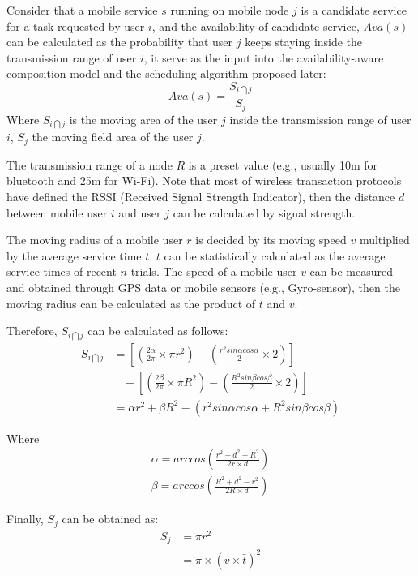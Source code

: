 \documentclass[journal]{IEEEtran}
\begin{document}
Consider that a mobile service $s$ running on mobile node $j$ is a candidate service for a task requested by user $i$, and the availability of candidate service, $Ava(s)$ can be calculated as the probability that user $j$ keeps staying inside the transmission range of user $i$, it serve as the input into the availability-aware composition model and the scheduling algorithm proposed later:
\begin{equation}
Ava(s) = \frac{S_{i \bigcap j}}{S_j}
\end{equation}
Where $S_{i \bigcap j}$ is the moving area of the user $j$ inside the transmission range of user $i$, $S_j$ the moving field area of the user $j$.

The transmission range of a node $R$ is a preset value (e.g., usually 10m for bluetooth and 25m for Wi-Fi). 
Note that most of wireless transaction protocols have defined the RSSI (Received Signal Strength Indicator), then the distance $d$ between mobile user $i$ and user $j$ can be calculated by signal strength.

The moving radius of a mobile user $r$ is decided by its moving speed $v$ multiplied by the average service time $\bar{t}$. $\bar{t}$ can be statistically calculated as the average service times of recent $n$ trials.
The speed of a mobile user $v$ can be measured and obtained through GPS data or mobile sensors (e.g., Gyro-sensor), then the moving radius can be calculated as the product of $\bar{t}$ and $v$.

Therefore, $S_{i \bigcap j}$ can be calculated as follows:
\setlength{\arraycolsep}{0.0em}
\begin{align}
S_{i \bigcap j} & =  [(\frac{2\alpha}{2\pi} \times \pi r^2)-(\frac{r^2 sin\alpha cos\alpha}{2} \times 2)]\\\nonumber
& \ \ \ \ +[(\frac{2\beta}{2\pi} \times \pi R^2)-(\frac{R^2 sin\beta cos\beta}{2} \times 2)]\\\nonumber
& = \alpha r^2 + \beta R^2 - (r^2 sin\alpha cos\alpha + R^2 sin\beta cos\beta)
\end{align}
\setlength{\arraycolsep}{5pt}

Where
\begin{eqnarray}
\alpha = arccos(\frac{r^2+d^2-R^2}{2r\times d}) \\\nonumber
\beta = arccos(\frac{R^2+d^2-r^2}{2R\times d})
\end{eqnarray}

Finally, $S_j$ can be obtained as:
\begin{align}
S_j & = \pi r^2 \\\nonumber
& = \pi \times (v \times \bar{t})^2
\end{align}
\end{document}
